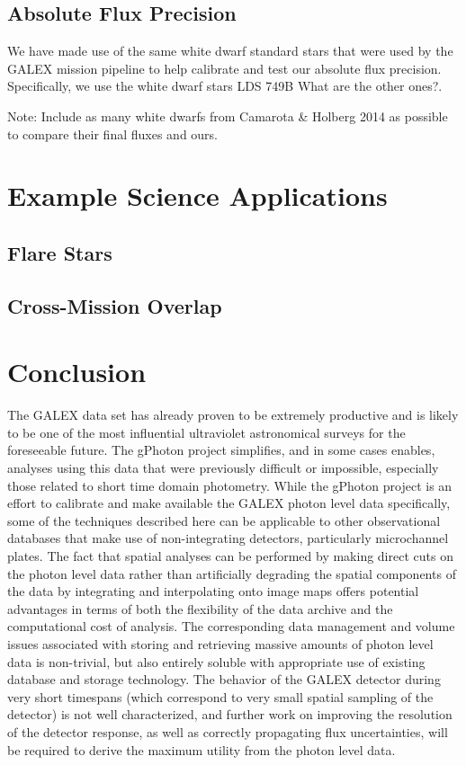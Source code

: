 \documentclass[preprint]{aastex}
\begin{document}
\subsection{Absolute Flux Precision}
We have made use of the same white dwarf standard stars that were used by the GALEX mission pipeline to help calibrate and test our absolute flux precision.  Specifically, we use the white dwarf stars LDS 749B {\color{red}What are the other ones?}.

{\color{red}Note: Include as many white dwarfs from Camarota \& Holberg 2014 as possible to compare their final fluxes and ours.}

\section{Example Science Applications}
\label{scienceexamples}

\subsection{Flare Stars}

\subsection{Cross-Mission Overlap}

\section{Conclusion}
The GALEX data set has already proven to be extremely productive and is likely to be one of the most influential ultraviolet astronomical surveys for the foreseeable future. The gPhoton project simplifies, and in some cases enables, analyses using this data that were previously difficult or impossible, especially those related to short time domain photometry. While the gPhoton project is an effort to calibrate and make available the GALEX photon level data specifically, some of the techniques described here can be applicable to other observational databases that make use of non-integrating detectors, particularly microchannel plates. The fact that spatial analyses can be performed by making direct cuts on the photon level data rather than artificially degrading the spatial components of the data by integrating and interpolating onto image maps offers potential advantages in terms of both the flexibility of the data archive and the computational cost of analysis. The corresponding data management and volume issues associated with storing and retrieving massive amounts of photon level data is non-trivial, but also entirely soluble with appropriate use of existing database and storage technology. The behavior of the GALEX detector during very short timespans (which correspond to very small spatial sampling of the detector) is not well characterized, and further work on improving the resolution of the detector response, as well as correctly propagating flux uncertainties, will be required to derive the maximum utility from the photon level data.
\end{document}
